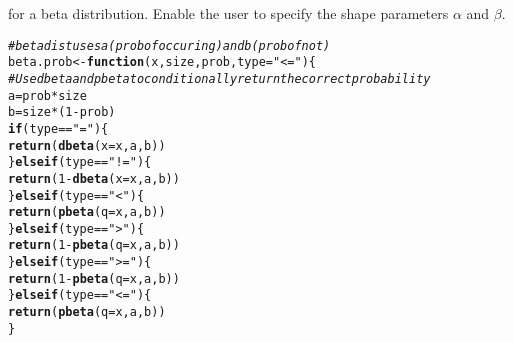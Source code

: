 \documentclass{article}\usepackage[]{graphicx}\usepackage[]{xcolor}
\makeatletter
\newcommand{\hlnum}[1]{\textcolor[rgb]{0.686,0.059,0.569}{#1}}%
\newcommand{\hlsng}[1]{\textcolor[rgb]{0.192,0.494,0.8}{#1}}%
\newcommand{\hlcom}[1]{\textcolor[rgb]{0.678,0.584,0.686}{\textit{#1}}}%
\newcommand{\hlopt}[1]{\textcolor[rgb]{0,0,0}{#1}}%
\newcommand{\hldef}[1]{\textcolor[rgb]{0.345,0.345,0.345}{#1}}%
\newcommand{\hlkwa}[1]{\textcolor[rgb]{0.161,0.373,0.58}{\textbf{#1}}}%
\newcommand{\hlkwb}[1]{\textcolor[rgb]{0.69,0.353,0.396}{#1}}%
\newcommand{\hlkwc}[1]{\textcolor[rgb]{0.333,0.667,0.333}{#1}}%
\newcommand{\hlkwd}[1]{\textcolor[rgb]{0.737,0.353,0.396}{\textbf{#1}}}%
\newenvironment{kframe}{%
 \def\at@end@of@kframe{}%
 \ifinner\ifhmode%
  \def\at@end@of@kframe{\end{minipage}}%
  \begin{minipage}{\columnwidth}%
 \fi\fi%
 \def\FrameCommand##1{\hskip\@totalleftmargin \hskip-\fboxsep
 \colorbox{shadecolor}{##1}\hskip-\fboxsep
     \hskip-\linewidth \hskip-\@totalleftmargin \hskip\columnwidth}%
 \MakeFramed {\advance\hsize-\width
   \@totalleftmargin\z@ \linewidth\hsize
   \@setminipage}}%
 {\par\unskip\endMakeFramed%
 \at@end@of@kframe}
\newenvironment{knitrout}{}{} %
\makeatother
\begin{document}
\begin{enumerate}
    for a beta distribution. Enable the user to specify the shape parameters
    $\alpha$ and $\beta$.
\begin{knitrout}\scriptsize
{}\color{fgcolor}\begin{kframe}
\begin{alltt}
\hlcom{# beta dist uses a(prob of occuring) and b(prob of not)}
\hldef{beta.prob} \hlkwb{<-} \hlkwa{function}\hldef{(}\hlkwc{x}\hldef{,} \hlkwc{size}\hldef{,} \hlkwc{prob}\hldef{,} \hlkwc{type}\hldef{=}\hlsng{"<="}\hldef{)\{}
  \hlcom{# Use dbeta and pbeta to conditionally return the correct probability}
  \hldef{a} \hlkwb{=} \hldef{prob}\hlopt{*} \hldef{size}
  \hldef{b} \hlkwb{=} \hldef{size} \hlopt{*}\hldef{(}\hlnum{1}\hlopt{-}\hldef{prob)}
  \hlkwa{if}\hldef{(type} \hlopt{==} \hlsng{"="}\hldef{)\{}
    \hlkwd{return}\hldef{(}\hlkwd{dbeta}\hldef{(}\hlkwc{x} \hldef{= x, a, b))}
  \hldef{\}}\hlkwa{else if}\hldef{(type} \hlopt{==} \hlsng{"!="}\hldef{)\{}
    \hlkwd{return}\hldef{(}\hlnum{1} \hlopt{-} \hlkwd{dbeta}\hldef{(}\hlkwc{x} \hldef{= x, a, b))}
  \hldef{\}}\hlkwa{else if}\hldef{(type} \hlopt{==} \hlsng{"<"}\hldef{)\{}
    \hlkwd{return}\hldef{(}\hlkwd{pbeta}\hldef{(}\hlkwc{q} \hldef{= x, a, b))}
  \hldef{\}}\hlkwa{else if}\hldef{(type} \hlopt{==} \hlsng{">"}\hldef{)\{}
    \hlkwd{return}\hldef{(}\hlnum{1} \hlopt{-} \hlkwd{pbeta}\hldef{(}\hlkwc{q} \hldef{= x, a, b))}
  \hldef{\}}\hlkwa{else if}\hldef{(type} \hlopt{==} \hlsng{">="}\hldef{)\{}
    \hlkwd{return}\hldef{(}\hlnum{1} \hlopt{-} \hlkwd{pbeta}\hldef{(}\hlkwc{q} \hldef{= x, a, b))}
  \hldef{\}}\hlkwa{else if}\hldef{(type} \hlopt{==} \hlsng{"<="}\hldef{)\{}
    \hlkwd{return}\hldef{(}\hlkwd{pbeta}\hldef{(}\hlkwc{q} \hldef{= x, a, b))}
  \hldef{\}}


\end{alltt}
\end{kframe}
\end{knitrout}
\end{enumerate}
\end{document}
